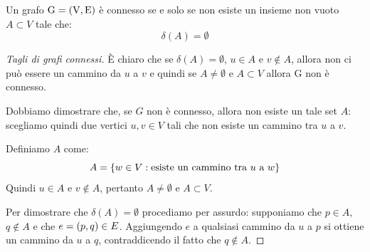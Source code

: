 \documentclass[\main/main.tex]{subfiles}
\begin{document}
\begin{theorem}
  Un grafo \(\operatorname*{G=\left(V, E\right)} \) è connesso se e solo se non esiste un insieme non vuoto \(A \subset V\) tale che:
  \[
    \delta(A) = \emptyset
  \]
\end{theorem}
\begin{proof}[Tagli di grafi connessi]
  È chiaro che se \(\delta(A) = \emptyset \), \(u \in A\) e \(v \not\in A\), allora non ci può essere un cammino da \(u\) a \(v\) e quindi se \(A \neq \emptyset \) e \(A \subset V\) allora G non è connesso.

  Dobbiamo dimostrare che, se \(G\) non è connesso, allora non esiste un tale set \(A\): scegliamo quindi due vertici \(u, v \in V\) tali che non esiste un cammino tra \(u\) a \(v\).

  Definiamo \(A\) come:
  \[
    A = \left\{w \in V: \text{esiste un cammino tra \(u\) a \(w\)}\right\}
  \]
  Quindi \(u \in A\) e \(v \not\in A\), pertanto \(A \neq \emptyset \) e \(A \subset V\).

  Per dimostrare che \(\delta(A) = \emptyset \) procediamo per assurdo: supponiamo che \(p \in A\), \(q \not\in A\) e che \(e = \left(p,q\right) \in E\). Aggiungendo \(e\) a qualsiasi cammino da \(u\) a \(p\) si ottiene un cammino da \(u\) a \(q\), contraddicendo il fatto che \(q \not\in A\).
\end{proof}
\clearpage
\end{document}
